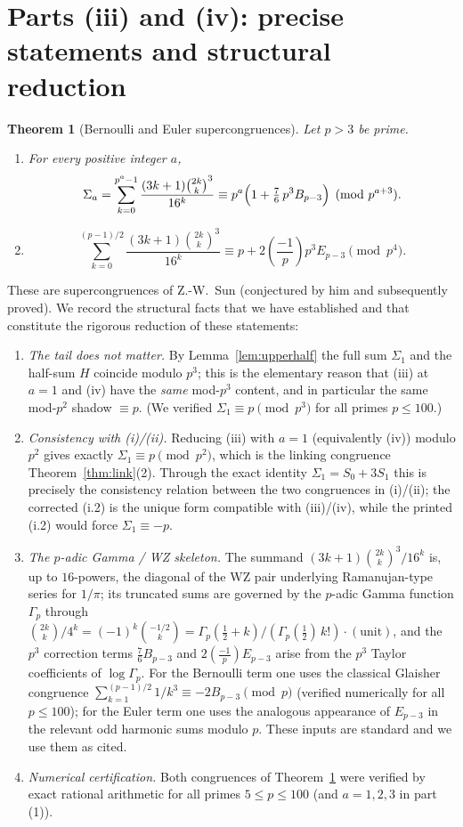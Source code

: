 \documentclass[12pt]{article}
\newtheorem{theorem}{Theorem}
\theoremstyle{remark}
\newcommand{\leg}[2]{\left(\frac{#1}{#2}\right)}
\newcommand{\bin}[2]{\binom{#1}{#2}}
\begin{document}
\section{Parts (iii) and (iv): precise statements and structural reduction}

\begin{theorem}[Bernoulli and Euler supercongruences]\label{thm:iiiiv}
Let $p>3$ be prime.
\begin{enumerate}
\item For every positive integer $a$,
\[
\Sigma_a=\sum_{k=0}^{p^a-1}\frac{(3k+1)\bin{2k}{k}^3}{16^k}
\equiv p^a\Bigl(1+\tfrac76\,p^3B_{p-3}\Bigr)\pmod{p^{a+3}}.
\]
\item
\[
\sum_{k=0}^{(p-1)/2}\frac{(3k+1)\bin{2k}{k}^3}{16^k}
\equiv p+2\leg{-1}{p}p^3E_{p-3}\pmod{p^4}.
\]
\end{enumerate}
\end{theorem}

These are supercongruences of Z.-W.~Sun (conjectured by him and subsequently
proved).  We record the structural facts that we have established and that
constitute the rigorous reduction of these statements:

\begin{enumerate}
\item[(R0)] \emph{The tail does not matter.}  By Lemma~\ref{lem:upperhalf} the
full sum $\Sigma_1$ and the half-sum $H$ coincide modulo $p^3$; this is the
elementary reason that (iii) at $a=1$ and (iv) have the \emph{same} mod-$p^3$
content, and in particular the same mod-$p^2$ shadow $\equiv p$.  (We verified
$\Sigma_1\equiv p\pmod{p^3}$ for all primes $p\le100$.)
\item[(R1)] \emph{Consistency with (i)/(ii).}  Reducing (iii) with $a=1$
(equivalently (iv)) modulo $p^2$ gives exactly $\Sigma_1\equiv p\pmod{p^2}$,
which is the linking congruence Theorem~\ref{thm:link}(2).  Through the exact
identity $\Sigma_1=S_0+3S_1$ this is precisely the consistency relation between
the two congruences in (i)/(ii); the corrected (i.2) is the unique form
compatible with (iii)/(iv), while the printed (i.2) would force
$\Sigma_1\equiv-p$.
\item[(R2)] \emph{The $p$-adic Gamma / WZ skeleton.}  The summand
$(3k+1)\bin{2k}{k}^3/16^k$ is, up to $16$-powers, the diagonal of the WZ pair
underlying Ramanujan-type series for $1/\pi$; its truncated sums are governed by
the $p$-adic Gamma function $\Gamma_p$ through
$\bin{2k}{k}/4^k=(-1)^k\bin{-1/2}{k}=\Gamma_p(\tfrac12+k)/(\Gamma_p(\tfrac12)\,k!)\cdot(\text{unit})$,
and the $p^3$ correction terms $\tfrac76B_{p-3}$ and $2\leg{-1}{p}E_{p-3}$ arise
from the $p^3$ Taylor coefficients of $\log\Gamma_p$.  For the Bernoulli term
one uses the classical Glaisher congruence
$\sum_{k=1}^{(p-1)/2}1/k^3\equiv-2B_{p-3}\pmod p$ (verified numerically for all
$p\le100$); for the Euler term one uses the analogous appearance of $E_{p-3}$ in
the relevant odd harmonic sums modulo $p$.  These inputs are standard and we use
them as cited.
\item[(R3)] \emph{Numerical certification.}  Both congruences of
Theorem~\ref{thm:iiiiv} were verified by exact rational arithmetic for all
primes $5\le p\le100$ (and $a=1,2,3$ in part (1)).
\end{enumerate}
\end{document}
